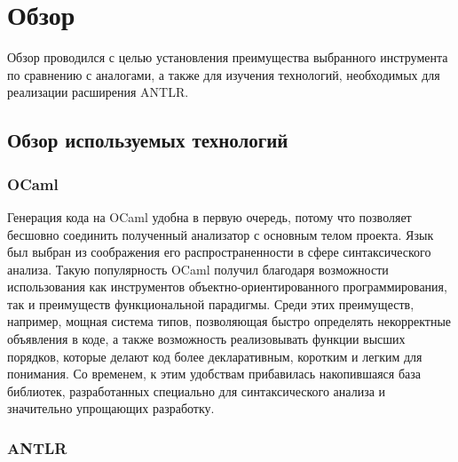 
\section{Обзор}
\label{sec:relatedworks}

Обзор проводился с целью установления преимущества выбранного инструмента по сравнению с аналогами, а также для изучения технологий, необходимых для реализации расширения ANTLR.

\subsection{Обзор используемых технологий}

\subsubsection{OCaml}

Генерация кода на OCaml удобна в первую очередь, потому что позволяет бесшовно соединить полученный анализатор с основным телом проекта. 
Язык был выбран из соображения его распространенности в сфере синтаксического анализа.
Такую популярность OCaml получил благодаря возможности использования как инструментов объектно-ориентированного программирования, так и преимуществ функциональной парадигмы. 
Среди этих преимуществ, например, мощная система типов, позволяющая быстро определять некорректные объявления в коде, а также возможность реализовывать функции высших порядков, которые делают код более декларативным, коротким и легким для понимания.
Со временем, к этим удобствам прибавилась накопившаяся база библиотек, разработанных специально для синтаксического анализа и значительно упрощающих разработку. 

\subsubsection{ANTLR}

